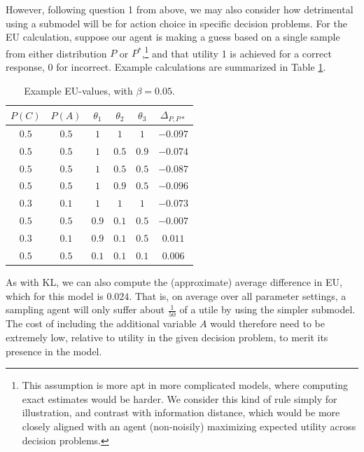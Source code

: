 \documentclass[10pt,letterpaper]{article}
\begin{document}
However, following question 1 from above, we may also consider how detrimental using a submodel will be for action choice in specific decision problems.
For the EU calculation, suppose our agent is making a guess based on a single sample from either distribution $P$ or $P^*$,\footnote{This assumption is more apt in more complicated models, where computing exact estimates would be harder. We consider this kind of rule simply for illustration, and contrast with information distance, which would be more closely aligned with an agent (non-noisily) maximizing expected utility across decision problems.\label{fn}} and that utility 1 is achieved for a correct response, 0 for incorrect. Example calculations are summarized in Table \ref{table2}.
%
\begin{table}[h]  \begin{center}
\begin{tabular}{c | c | c | c | c || c}
 $P(C)$ & $P(A)$ & $\theta_1$ & $\theta_2$ & $\theta_3$ & $\Delta_{P,P*}$ \\ \hline
 $0.5$ & $0.5$ & $1$ & $1$ & $1$  & $-0.097$ \\
  $0.5$ & $0.5$ & $1$ & $0.5$ & $0.9$  & $-0.074$ \\
  $0.5$ & $0.5$ &$1$ & $0.5$ & $0.5$  & $-0.087$ \\
 $0.5$ & $0.5$ & $1$ & $0.9$ & $0.5$  & $-0.096$ \\
  $0.3$ & $0.1$ & $1$ & $1$ & $1$ & $-0.073$ \\
 $0.5$ & $0.5$ &  $0.9$ & $0.1$ & $0.5$  & $-0.007$ \\
  $0.3$ & $0.1$ & $0.9$ & $0.1$ & $0.5$ & $0.011$ \\
 $0.5$ & $0.5$ & $0.1$ & $0.1$ & $0.1$ & $0.006$ 
\end{tabular} \end{center} \caption{Example EU-values, with $\beta = 0.05$.} \label{table2}
\end{table}
%
As with KL, we can also compute the (approximate) average difference in EU, which for this model is $0.024$. That is, on average over all parameter settings, a sampling agent will only suffer about $\frac{1}{50}$ of a utile by using the simpler submodel. The cost of including the additional variable $A$ would therefore need to be extremely low, relative to utility in the given decision problem, to merit its presence in the model.
\end{document}
